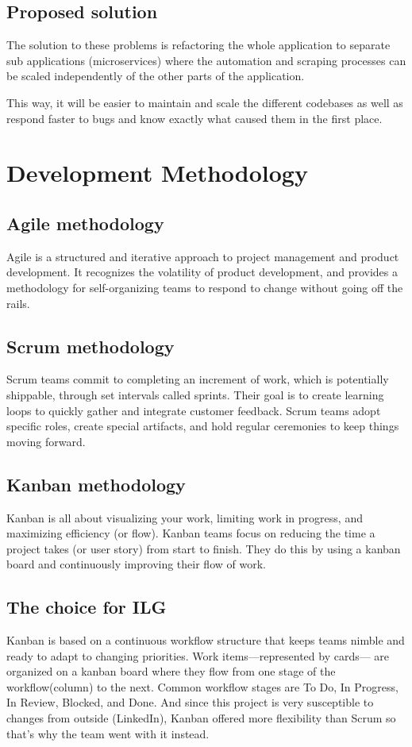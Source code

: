 \subsection{Proposed solution}
The solution to these problems is refactoring the whole application to separate sub applications (microservices) where the automation and scraping processes can be scaled independently of the other parts of the application.

\medskip
This way, it will be easier to maintain and scale the different codebases as well as respond faster to bugs and know exactly what caused them in the first place.

\newpage

\section{Development Methodology}
\subsection{Agile methodology}
Agile is a structured and iterative approach to project management and product development. It recognizes the volatility of product development, and provides a methodology for self-organizing teams to respond to change without going off the rails.
\subsection{Scrum methodology}
Scrum teams commit to completing an increment of work, which is potentially shippable, through set intervals called sprints. Their goal is to create learning loops to quickly gather and integrate customer feedback. Scrum teams adopt specific roles, create special artifacts, and hold regular ceremonies to keep things moving forward.
\subsection{Kanban methodology}
Kanban is all about visualizing your work, limiting work in progress, and maximizing efficiency (or flow). Kanban teams focus on reducing the time a project takes (or user story) from start to finish. They do this by using a kanban board and continuously improving their flow of work.
\subsection{The choice for ILG}
Kanban is based on a continuous workflow structure that keeps teams nimble and ready to adapt to changing priorities. Work items—represented by cards— are organized on a kanban board where they flow from one stage of the workflow(column) to the next. Common workflow stages are To Do, In Progress, In Review, Blocked, and Done. And since this project is very susceptible to changes from outside (LinkedIn), Kanban offered more flexibility than Scrum so that’s why the team went with it instead.
